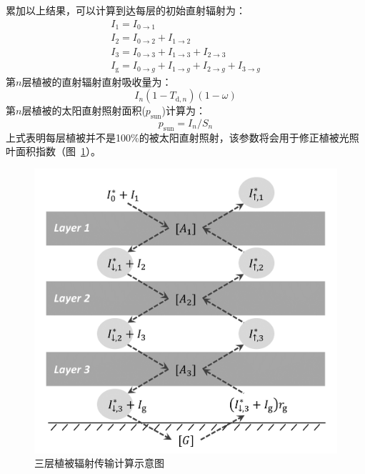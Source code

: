 累加以上结果，可以计算到达每层的初始直射辐射为：
\begin{equation}
  \begin{array}{l}I_{1}=I_{0 \rightarrow 1} \\ I_{2}=I_{0 \rightarrow 2}+I_{1 \rightarrow 2} \\
    I_{3}=I_{0 \rightarrow 3}+I_{1 \rightarrow 3}+I_{2 \rightarrow 3} \\
  I_{\mathrm g}=I_{0 \rightarrow g}+I_{1 \rightarrow g}+I_{2 \rightarrow g}+I_{3 \rightarrow g}\end{array}
\end{equation}
第$n$层植被的直射辐射直射吸收量为：
\begin{equation}
  I_{n}\left(1-T_{\mathrm{d}, n}\right)(1-\omega)
\end{equation}
第$n$层植被的太阳直射照射面积($p_{\mathrm{sun}}$)计算为：
\begin{equation}
  p_{\mathrm{sun}}=I_{n} / S_{n}
\end{equation}
上式表明每层植被并不是100\%的被太阳直射照射，该参数将会用于修正植被光照叶面积指数（图~\ref{fig:三层植被辐射传输计算示意图}）。
{
  \begin{figure}[htbp]
    \centering
    \includegraphics[width=0.7\columnwidth]{Figures/辐射过程及辐射通量计算/三层植被辐射传输计算示意图_v2.png}
    \caption{三层植被辐射传输计算示意图}
    \label{fig:三层植被辐射传输计算示意图}
  \end{figure}
}

